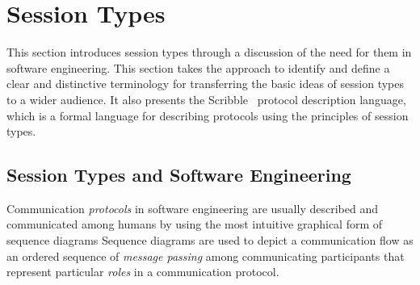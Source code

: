 
\section{Session Types}
\label{sec:session_types}


This section introduces session types through
a discussion of the need for them in
software engineering.
This section takes the approach to identify and define
a clear and distinctive terminology
for transferring the basic ideas of session types to a wider audience.
It also presents the Scribble~\cite{scribble} protocol
description language, which is a formal language for describing
protocols using the principles of session types.

\subsection{Session Types and Software Engineering}%
\label{sec:sessions_software}



Communication \emph{protocols} in software engineering
are usually described and communicated among humans
by using the most intuitive graphical form of sequence diagrams
Sequence diagrams are used to depict a communication flow as an ordered
sequence of \emph{message passing} among communicating
participants that represent particular \emph{roles} in a communication
protocol.

